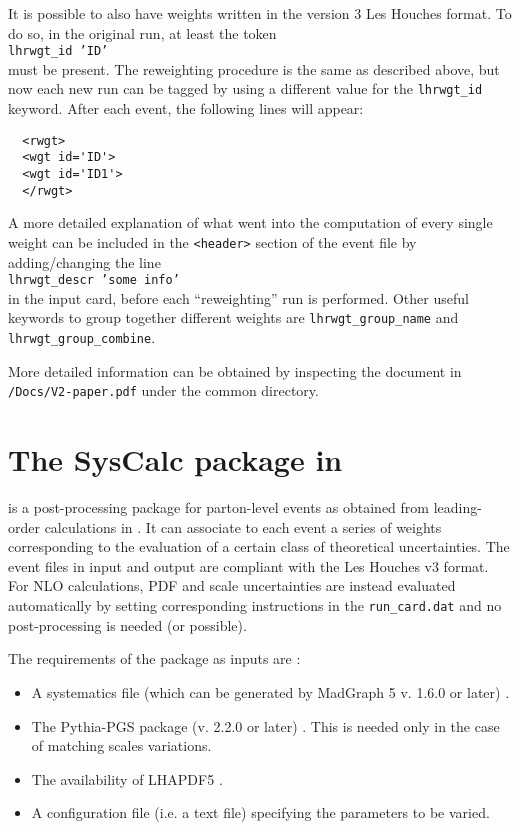 \noindent It is possible to also have weights written in the version 3 Les Houches format. 
To do so, in the original run, at least the token\\
\texttt{lhrwgt\_id 'ID'}\\
\noindent must be present. The reweighting procedure is the same as described 
above, but now each new run can be tagged by using a different value 
for the \texttt{lhrwgt\_id} keyword. After each event, the following lines will 
appear: 
\small{
\begin{verbatim}
  <rwgt> 
  <wgt id='ID'>
  <wgt id='ID1'>
  </rwgt> 
\end{verbatim}}
\normalsize

A more detailed explanation of what went into the computation of every 
single weight can be included in the \texttt{<header>} section of the event 
file by adding/changing the line \\
\texttt{lhrwgt\_descr 'some info'}\\
\noindent in the input card, before each ``reweighting'' run is performed. Other 
useful keywords to group together different weights are 
\texttt{lhrwgt\_group\_name} and \texttt{lhrwgt\_group\_combine}. 

More detailed information can be obtained by inspecting the document in 
\texttt{/Docs/V2-paper.pdf} under the common  directory. 

\section{The SysCalc package in \madgraph}


\syscalc is a post-processing package for parton-level events as obtained from leading-order calculations in \madgraph.  It can associate to each event a series of weights corresponding to the evaluation of a certain class of theoretical uncertainties. The event files in input and output are compliant with  the Les Houches v3 format.
For NLO calculations, PDF and scale uncertainties are instead evaluated automatically by setting corresponding instructions in the \texttt{run\_card.dat} and no post-processing is needed (or possible).

The requirements of the package as inputs are : 
\begin{itemize}
\item A systematics file (which can be generated by MadGraph 5 v. 1.6.0 or later) \cite{Alwall:2014hca,Alwall:2011uj}.
\item The Pythia-PGS package (v. 2.2.0 or later) \cite{Sjostrand:2006za}. This is needed only in the case of matching scales variations.
\item The availability of LHAPDF5 \cite{Whalley:2005nh}.
\item A configuration file (i.e. a text file) specifying the parameters to be varied. 
\end{itemize}


